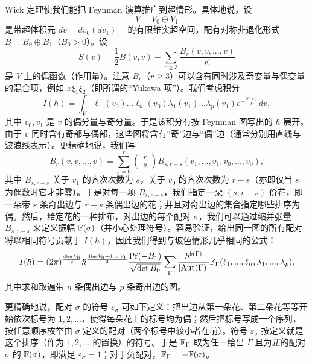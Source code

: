 Wick 定理使我们能把 Feynman 演算推广到超情形。具体地说，设
$$
V=V_0\oplus V_1
$$
是带超体积元 $dv=dv_0(dv_1)^{-1}$ 的有限维实超空间，配有对称非退化形式 $B=B_0\oplus B_1$（$B_0>0$）。设
$$
S(v)=\frac{1}{2}B(v,v)-\sum_{r\ge 3}\frac{B_r(v,v,...,v)}{r!}
$$
是 $V$ 上的偶函数（作用量）。注意 $B_r$（$r\ge 3$）可以含有同时涉及奇变量与偶变量的混合项，例如 $x\xi_1\xi_2$（即所谓的“Yukawa 项”）。我们考虑积分
$$
I(\hbar)=\int_V \ell_1(v_0)...\ell_n(v_0)\lambda_1(v_1)...\lambda_p(v_1)e^{-\frac{S(v)}{\hbar}}dv,
$$
其中 $v_0,v_1$ 是 $v$ 的偶分量与奇分量。于是该积分有按 Feynman 图写出的 $\hbar$ 展开。由于 $v$ 同时含有奇部与偶部，这些图将含有“奇”边与“偶”边（通常分别用直线与波浪线表示）。更精确地说，我们写
$$
B_r(v,v,...,v)=\sum_{s=0}^r\begin{pmatrix}r\\ s
\end{pmatrix}
B_{s,r-s}(v_1,...,v_1,v_0,...,v_0),
$$
其中 $B_{s,r-s}$ 关于 $v_1$ 的齐次次数为 $s$，关于 $v_0$ 的齐次次数为 $r-s$（亦即仅当 $s$ 为偶数时它才非零）。于是对每一项 $B_{s,r-s}$，我们指定一朵 $(s,r-s)$ 价花，即一朵带 $s$ 条奇出边与 $r-s$ 条偶出边的花；并且对奇出边的集合指定哪些排序为偶。然后，给定花的一种排布，对出边的每个配对 $\sigma$，我们可以通过缩并张量 $B_{s,r-s}$ 来定义振幅 $\Bbb F(\sigma)$（并小心处理符号）。容易验证，给出同一图的所有配对将以相同符号贡献于 $I(\hbar)$，因此我们得到与玻色情形几乎相同的公式：
$$
I(\hbar)=(2\pi)^{\frac{\dim V_0}{2}}\hbar^{\frac{\dim V_0-\dim V_1}{2}}
\frac{{\rm Pf}(-B_1)}{\sqrt{\det B_0}}
\sum_{\Gamma}\frac{\hbar^{b(\Gamma)}}{|{\rm Aut}(\Gamma)|}\Bbb F_\Gamma (\ell_1,...,\ell_n,\lambda_1,...,\lambda_p),
$$
其中求和取遍带 $n$ 条偶出边与 $p$ 条奇出边的图。

\begin{remark} 更精确地说，配对 $\sigma$ 的符号 $\varepsilon_\sigma$ 可如下定义：把出边从第一朵花、第二朵花等等开始依次标号为 $1,2,...$，使得每朵花上的标号均为偶；然后把标号写成一个序列，按任意顺序枚举由 $\sigma$ 定义的配对（两个标号中较小者在前）。符号 $\varepsilon_\sigma$ 按定义就是这个排序（作为 $1,2,...$ 的置换）的符号。于是 $\Bbb F_\Gamma$ 取为任一给出 $\Gamma$ 且为\emph{正}的配对 $\sigma$ 的 $\Bbb F(\sigma)$，即满足 $\varepsilon_\sigma=1$；对于负配对，$\Bbb F_\Gamma=-\Bbb F(\sigma)$。
\end{remark}


